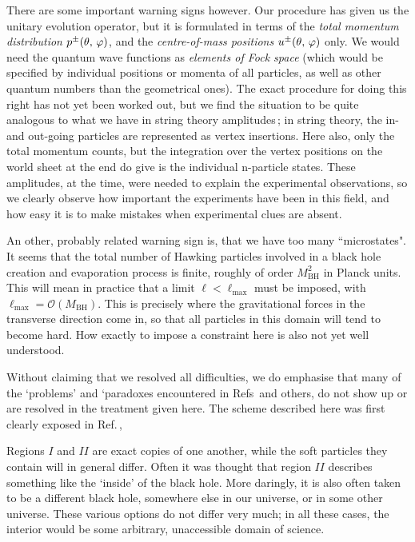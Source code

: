 \documentclass[12pt]{article}
\def\OO{{\mathcal O}} 	\def\DD{{\mathcal D}}	     \def\ZZ{\mathbb{Z}}
\def\BH{{\mathrm{BH}}}\def\Pl{{\mathrm{Pl}}}\def\inn{{\mathrm{in}}} \def\outt{{\mathrm{out}}}
\begin{document}
There are some important warning signs however.  Our procedure has given us the unitary evolution operator, but it is formulated in terms of the \emph{total momentum distribution} \(p^\pm(\theta,\,\varphi)\), and the \emph{centre-of-mass positions} \(u^\pm(\theta,\,\varphi)\) only. We would need the quantum wave functions as {\em elements of Fock space} (which would be specified by individual positions or momenta of all particles, as well as other quantum numbers than the geometrical ones). The exact procedure for doing this right has not yet been worked out, but we find the situation to be quite analogous to what we have in string theory amplitudes\,\cite{GtHstrings1, GtHstrings2}; in string theory, the in- and out-going particles are represented as vertex insertions. Here also, only the total momentum counts, but the integration over the vertex positions on the world sheet at the end do give is the individual n-particle states. These amplitudes, at the time, were needed to explain the experimental observations, so we clearly observe how important the experiments have been in this field, and how easy it is to make mistakes when experimental clues are absent.

An other, probably related warning sign is, that we have too many ``microstates". It seems that the total number of Hawking particles involved in a black hole creation and evaporation process is finite, roughly of order \(M_\BH^2\) in Planck units. This will mean in practice that a limit \(\ell<\ell_{\mathrm{max}}\) must be imposed, with \(\ell_{\mathrm{max}}=\OO(M_\BH)\). This is precisely where the gravitational  forces in the transverse direction come in, so that all particles in this domain will tend to become hard. How exactly to impose a constraint here is also not yet well understood.

Without claiming that we resolved all difficulties, we do emphasise that many of the `problems' and `paradoxes encountered in Refs\,\cite{firewall, Giddings1, Polch, Giddings4} and others, do not show up or are resolved  in the treatment given here. The scheme described here was first clearly exposed in Ref.\,\cite{GtHrecent1},




Regions \(I\) and \(II\) are exact copies of one another, while the soft particles they contain will in general differ. Often it was thought that region \(II\) describes something like the `inside' of the black hole. More daringly, it is also often taken to be a different black hole, somewhere else in our universe,  or in some other universe. These various options do not differ very much; in all these cases, the interior would be some arbitrary, unaccessible domain of science.
\end{document}
